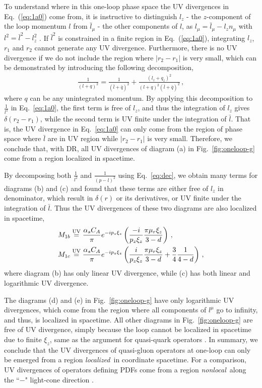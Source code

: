 To understand where in this one-loop phase space the UV divergences in Eq.~(\ref{eq:1a0}) come from, it is instructive to distinguish $l_z$ - the $z$-component of the loop momentum $l$ from $\bar{l}_\mu$ - the other components of $l$, as $l_\mu = \bar{l}_\mu - l_z n_{\mu}$ with $l^2=\bar{l}^2-l_z^2$ \cite{Ishikawa:2017faj}.
If $\bar{l}^2$ is constrained in a finite region in Eq.~(\ref{eq:1a0}), integrating $l_z$, $r_1$ and $r_2$ cannot generate any UV divergence.  Furthermore, there is no UV divergence if we do not include the region where $|r_2-r_1|$ is very small, which can be demonstrated by introducing the following decomposition,
\begin{align}\label{eq:dec}
\frac{1}{(l+q)^2}
= \frac{1}{(\bar{l}+\bar{q})^2}+ \frac{(l_z+q_z)^2}{(l+q)^2(\bar{l}+\bar{q})^2}\, ,
\end{align}
where $q$ can be any unintegrated momentum. By applying this decomposition to $\frac{1}{l^2} $ in Eq.~\eqref{eq:1a0}, the first term is free of $l_z$, and thus the integration of $l_z$ gives $\delta(r_2-r_1)$, while the second term is UV finite under the integration of $\bar{l}$.  That is, the UV divergence in Eq.~\eqref{eq:1a0} can only come from the region of phase space where $\bar{l}$ are in UV region while $|r_2-r_1|$ is very small. Therefore, we conclude that, with DR, all UV divergences of diagram (a) in Fig.~\ref{fig:oneloop-g} come from a region localized in spacetime.

By decomposing both $\frac{1}{l^2} $ and $\frac{1}{(p-l)^2}$ using Eq.~\eqref{eq:dec}, we obtain many terms for diagrams (b) and (c) and found that these terms are either free of $l_z$ in denominator, which result in $\delta(r)$ or its derivatives, or UV finite under the integration of $\bar{l}$. Thus the UV divergences of these two diagrams are also localized in spacetime,
\begin{align}
M_{1{b}}
&\stackrel{\text{\text{UV}}}{=} \frac{\alpha_s C_A}{\pi} e^{-i p_z \xi_z} \left(\frac{-i}{p_z \xi_z} \frac{\pi \mu_r \xi_z}{3-d} \right) \, , \label{eq:1b0}\\
M_{1c}
&\stackrel{\text{\text{UV}}}{=} \frac{\alpha_s C_A}{\pi} e^{-i p_z \xi_z} \left(\frac{i}{p_z \xi_z} \frac{\pi \mu_r \xi_z}{3-d}+\frac{3}{4} \frac{1}{4-d} \right) \, ,
\label{eq:1c0}
\end{align}
where diagram (b) has only linear UV divergence, while (c) has both linear and logarithmic UV divergence.

The diagrams (d) and (e) in Fig.~\ref{fig:oneloop-g} have only logarithmic UV divergences, which come from the region where all components of $l^\mu$ go to infinity, and thus, is localized in spacetime.
All other diagrams in Fig.~\ref{fig:oneloop-g} are free of UV divergence, simply because the loop cannot be localized in spacetime due to finite $\xi_z$, same as the argument for quasi-quark operators \cite{Ishikawa:2017faj}.
In summary, we conclude that the UV divergences of quasi-gluon operators at one-loop can only be emerged from a region {\it localized}\ in coordinate spacetime. For a comparison, UV divergences of operators defining PDFs come from a region   {\it nonlocal}\ along the ``$-$" light-cone direction \cite{Ishikawa:2017faj}.

